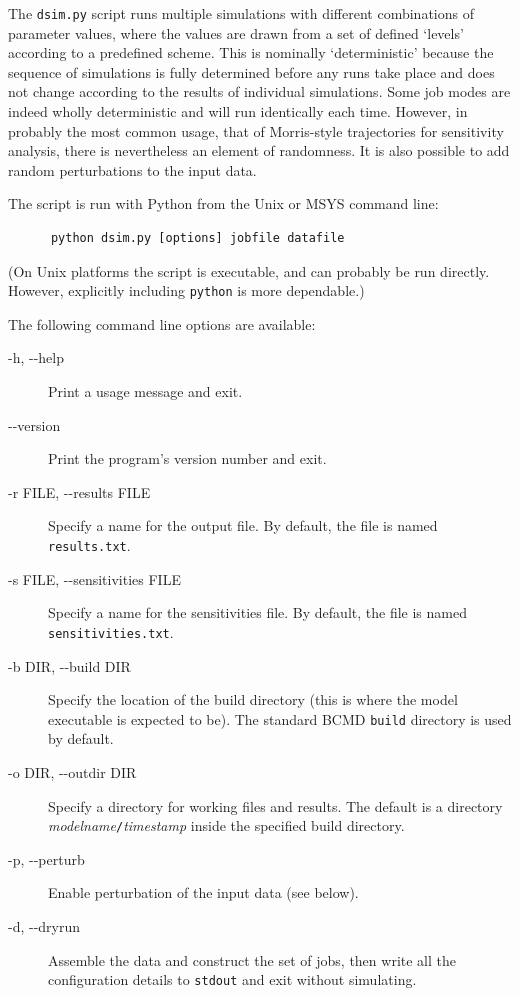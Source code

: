 \documentclass[a4paper,11pt]{article}
\begin{document}
The \texttt{dsim.py} script runs multiple simulations with different combinations of parameter values, where the values are drawn from a set of defined `levels' according to a predefined scheme. This is nominally `deterministic' because the sequence of simulations is fully determined before any runs take place and does not change according to the results of individual simulations. Some job modes are indeed wholly deterministic and will run identically each time. However, in probably the most common usage, that of Morris-style trajectories for sensitivity analysis, there is nevertheless an element of randomness. It is also possible to add random perturbations to the input data.

The script is run with Python from the Unix or MSYS command line:
\begin{verbatim}
      python dsim.py [options] jobfile datafile
\end{verbatim}
(On Unix platforms the script is executable, and can probably be run directly. However, explicitly including \texttt{python} is more dependable.)

The following command line options are available:
\begin{adjustwidth}{0.8cm}{0.8cm}
\begin{description}
\item[-h, -{}-help] Print a usage message and exit.
\item[-{}-version] Print the program's version number and exit.
\item[-r FILE, -{}-results FILE] Specify a name for the output file. By default, the file is named \texttt{results.txt}.
\item[-s FILE, -{}-sensitivities FILE] Specify a name for the sensitivities file. By default, the file is named \texttt{sensitivities.txt}.
\item[-b DIR, -{}-build DIR] Specify the location of the build directory (this is where the model executable is expected to be). The standard BCMD \texttt{build} directory is used by default.
\item[-o DIR, -{}-outdir DIR] Specify a directory for working files and results. The default is a directory \textit{modelname}\texttt{/}\textit{timestamp} inside the specified build directory.
\item[-p, -{}-perturb] Enable perturbation of the input data (see below).
\item[-d, -{}-dryrun] Assemble the data and construct the set of jobs, then write all the configuration details to \texttt{stdout} and exit without simulating.
\end{description}
\end{adjustwidth}
\end{document}
